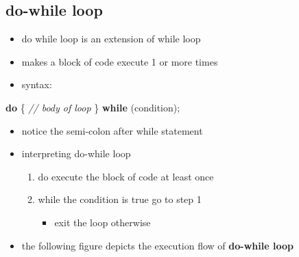 \documentclass[11pt]{article}
\providecommand{\tightlist}{%
      \setlength{\itemsep}{0pt}\setlength{\parskip}{0pt}}
\newenvironment{Shaded}{}{}
\newcommand{\CommentTok}[1]{\textcolor[rgb]{0.38,0.63,0.69}{\textit{{#1}}}}
\newcommand{\NormalTok}[1]{{#1}}
\newcommand{\ControlFlowTok}[1]{\textcolor[rgb]{0.00,0.44,0.13}{\textbf{{#1}}}}
\newcommand{\OperatorTok}[1]{\textcolor[rgb]{0.40,0.40,0.40}{{#1}}}
\begin{document}
    \hypertarget{do-while-loop}{%
\subsection{do-while loop}\label{do-while-loop}}

\begin{itemize}
\tightlist
\item
  do while loop is an extension of while loop
\item
  makes a block of code execute 1 or more times
\item
  syntax:
\end{itemize}

\begin{Shaded}
\begin{Highlighting}[]
\ControlFlowTok{do} \OperatorTok{\{}
    \CommentTok{// body of loop}
\OperatorTok{\}} \ControlFlowTok{while} \OperatorTok{(}\NormalTok{condition}\OperatorTok{);}
\end{Highlighting}
\end{Shaded}

\begin{itemize}
\tightlist
\item
  notice the semi-colon after while statement
\item
  interpreting do-while loop

  \begin{enumerate}
  \def\labelenumi{\arabic{enumi}.}
  \tightlist
  \item
    do execute the block of code at least once
  \item
    while the condition is true go to step 1

    \begin{itemize}
    \tightlist
    \item
      exit the loop otherwise
    \end{itemize}
  \end{enumerate}
\item
  the following figure depicts the execution flow of \textbf{do-while
  loop}
\end{itemize}
\end{document}
